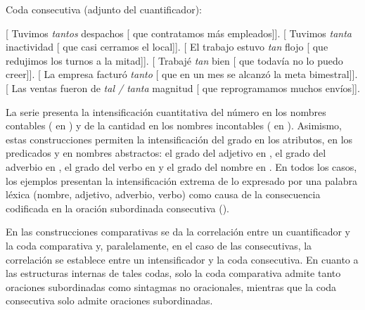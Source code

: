 \begin{exe}
  \ex\label{ex:13-consec} Coda consecutiva (adjunto del cuantificador):
    \begin{xlist}
      \ex\label{ex:13-consec-a} {}[ Tuvimos \textit{tantos} despachos
          [ que contratamos más empleados]].
      \ex\label{ex:13-consec-b} {}[ Tuvimos \textit{tanta} inactividad
          [ que casi cerramos el local]].
      \ex\label{ex:13-consec-c} {}[ El trabajo estuvo \textit{tan} flojo
          [ que redujimos los turnos a la mitad]].
      \ex\label{ex:13-consec-d} {}[ Trabajé \textit{tan} bien [
          que todavía no lo puedo creer]].
      \ex\label{ex:13-consec-e} {}[ La empresa facturó \textit{tanto}
          [ que en un mes se alcanzó la meta bimestral]].
      \ex\label{ex:13-consec-f} {}[ Las ventas fueron de \textit{tal /
          tanta} magnitud [ que reprogramamos muchos envíos]].
    \end{xlist}
\end{exe}

La serie  presenta la intensificación cuantitativa del número
en los nombres contables ( en ) y de la
cantidad en los nombres incontables ( en
). Asimismo, estas construcciones permiten la
intensificación del grado en los atributos, en los predicados y en nombres
abstractos: el grado del adjetivo  en , el
grado del adverbio  en , el grado del verbo
 en  y el grado del nombre 
en . En todos los casos, los ejemplos presentan la
intensificación extrema de lo expresado por una palabra léxica (nombre,
adjetivo, adverbio, verbo) como causa de la consecuencia codificada en la oración
subordinada consecutiva ().

En las construcciones comparativas se da la correlación entre un cuantificador y
la coda comparativa y, paralelamente, en el caso de las consecutivas, la
correlación se establece entre un intensificador y la coda consecutiva. En cuanto
a las estructuras internas de tales codas, solo la coda comparativa admite tanto
oraciones subordinadas como sintagmas no oracionales, mientras que la coda
consecutiva solo admite oraciones subordinadas.

